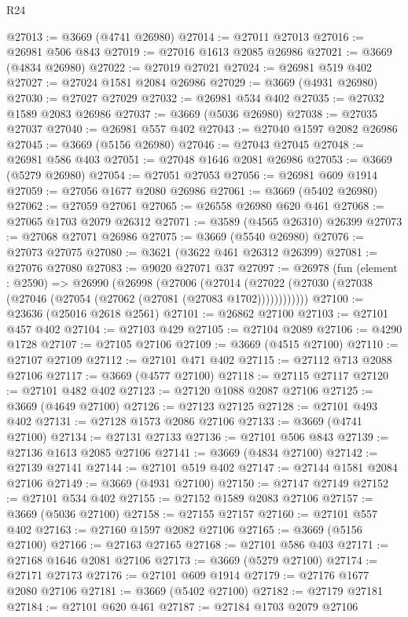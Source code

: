 \begin{lexlean}{R24}
\begin{coremodule}
@27013 := @3669 (@4741 @26980)
@27014 := @27011 @27013
@27016 := @26981 @506 @843
@27019 := @27016 @1613 @2085 @26986
@27021 := @3669 (@4834 @26980)
@27022 := @27019 @27021
@27024 := @26981 @519 @402
@27027 := @27024 @1581 @2084 @26986
@27029 := @3669 (@4931 @26980)
@27030 := @27027 @27029
@27032 := @26981 @534 @402
@27035 := @27032 @1589 @2083 @26986
@27037 := @3669 (@5036 @26980)
@27038 := @27035 @27037
@27040 := @26981 @557 @402
@27043 := @27040 @1597 @2082 @26986
@27045 := @3669 (@5156 @26980)
@27046 := @27043 @27045
@27048 := @26981 @586 @403
@27051 := @27048 @1646 @2081 @26986
@27053 := @3669 (@5279 @26980)
@27054 := @27051 @27053
@27056 := @26981 @609 @1914
@27059 := @27056 @1677 @2080 @26986
@27061 := @3669 (@5402 @26980)
@27062 := @27059 @27061
@27065 := @26558 @26980 @620 @461
@27068 := @27065 @1703 @2079 @26312
@27071 := @3589 (@4565 @26310) @26399
@27073 := @27068 @27071 @26986
@27075 := @3669 (@5540 @26980)
@27076 := @27073 @27075
@27080 := @3621 (@3622 @461 @26312 @26399)
@27081 := @27076 @27080
@27083 := @9020 @27071 @37
@27097 := @26978
    (fun (element : @2590) =>
    @26990
      (@26998
        (@27006
          (@27014 (@27022 (@27030 (@27038 (@27046 (@27054 (@27062 (@27081 (@27083 @1702))))))))))))
@27100 := @23636 (@25016 @2618 @2561)
@27101 := @26862 @27100
@27103 := @27101 @457 @402
@27104 := @27103 @429
@27105 := @27104 @2089
@27106 := @4290 @1728
@27107 := @27105 @27106
@27109 := @3669 (@4515 @27100)
@27110 := @27107 @27109
@27112 := @27101 @471 @402
@27115 := @27112 @713 @2088 @27106
@27117 := @3669 (@4577 @27100)
@27118 := @27115 @27117
@27120 := @27101 @482 @402
@27123 := @27120 @1088 @2087 @27106
@27125 := @3669 (@4649 @27100)
@27126 := @27123 @27125
@27128 := @27101 @493 @402
@27131 := @27128 @1573 @2086 @27106
@27133 := @3669 (@4741 @27100)
@27134 := @27131 @27133
@27136 := @27101 @506 @843
@27139 := @27136 @1613 @2085 @27106
@27141 := @3669 (@4834 @27100)
@27142 := @27139 @27141
@27144 := @27101 @519 @402
@27147 := @27144 @1581 @2084 @27106
@27149 := @3669 (@4931 @27100)
@27150 := @27147 @27149
@27152 := @27101 @534 @402
@27155 := @27152 @1589 @2083 @27106
@27157 := @3669 (@5036 @27100)
@27158 := @27155 @27157
@27160 := @27101 @557 @402
@27163 := @27160 @1597 @2082 @27106
@27165 := @3669 (@5156 @27100)
@27166 := @27163 @27165
@27168 := @27101 @586 @403
@27171 := @27168 @1646 @2081 @27106
@27173 := @3669 (@5279 @27100)
@27174 := @27171 @27173
@27176 := @27101 @609 @1914
@27179 := @27176 @1677 @2080 @27106
@27181 := @3669 (@5402 @27100)
@27182 := @27179 @27181
@27184 := @27101 @620 @461
@27187 := @27184 @1703 @2079 @27106

\end{coremodule}
\end{lexlean}
